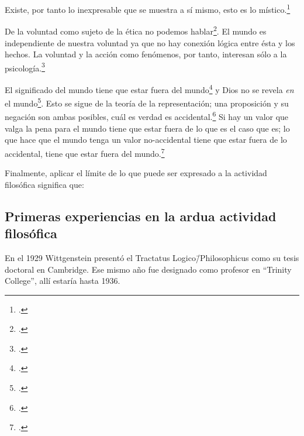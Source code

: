 Existe, por tanto lo inexpresable que se muestra a sí mismo, esto es lo
místico.\footcite[cf.~][6.522]{tractatus}

De la voluntad como sujeto de la ética no podemos
hablar\footcite[cf.~][6.423]{tractatus}. El mundo es independiente de nuestra
voluntad ya que no hay conexión lógica entre ésta y los hechos.
La voluntad y la acción como fenómenos, por tanto, interesan sólo a la
psicología.\footcite[cf.~][p.171 \S3]{IWT}

El significado del mundo tiene que estar fuera del
mundo\footcite[cf.~][6.41]{tractatus} y Dios no se revela \emph{en} el
mundo\footcite[cf.~][6.432]{tractatus}. 
Esto se sigue de la teoría de la representación; una proposición y su negación
son ambas posibles, cuál es verdad es accidental.\footcite[cf.~][p.170 \S4]{IWT}
Si hay un valor que valga la pena para el mundo tiene que estar fuera de lo que
es el caso que es; lo que hace que el mundo tenga un valor no-accidental tiene
que estar fuera de lo accidental, tiene que estar fuera del
mundo.\footcite[cf.~][6.41]{tractatus} 

Finalmente, aplicar el límite de lo que puede ser expresado a la actividad
filosófica significa que:

\subsection{Primeras experiencias en la ardua actividad filosófica}
En el 1929 Wittgenstein presentó el Tractatus Logico\=/Philosophicus como su
tesis doctoral en Cambridge. Ese mismo año fue designado como profesor en
``Trinity College'', allí estaría hasta 1936.

